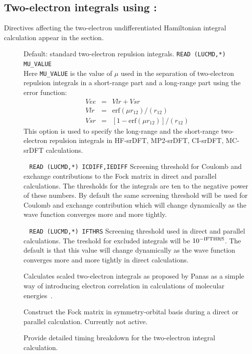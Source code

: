 
\subsection{Two-electron integrals using {\twoint}: }

Directives affecting the two-electron
undifferentiated Hamiltonian
integral calculation appear in the  section.

\begin{description}

\item[] Default: standard two-electron repulsion integrals.\newline
\verb|READ (LUCMD,*) MU_VALUE| \\
Here \verb|MU_VALUE| is the value of $\mu$ used in the separation of two-electron repulsion integrals in a short-range part and a long-range part using the error function:
\begin{eqnarray*}
Vee &=& Vlr+Vsr \\
Vlr &=& \mathrm{erf}(\mu r_{12})/(r_{12}) \\
Vsr &=& [1 -\mathrm{erf}(\mu r_{12})]/(r_{12}) 
\end{eqnarray*}
This option is used to specify the long-range and the short-range two-electron repulsion integrals
in HF-srDFT, MP2-srDFT, CI-srDFT, MC-srDFT calculations.

\item[]\verb| |\newline
\verb|READ (LUCMD,*) ICDIFF,IEDIFF|
Screening threshold for Coulomb and exchange
contributions to the Fock
matrix in direct and parallel calculations. The thresholds for the
integrals are ten to the negative power of these numbers. By default the same
screening threshold will be used for Coulomb and exchange
contribution which will change dynamically as the wave function
converges more and more tightly.

\item[]\verb| |\newline
\verb|READ (LUCMD,*) IFTHRS|
Screening threshold used in direct and
parallel calculations. The treshold for excluded integrals will be $10^{\rm -IFTHRS}$.
The default is that this value will change dynamically as the wave function converges more and more tightly
in direct calculations.

\item[] Calculates scaled two-electron integrals as
proposed by Panas as a simple way of introducing electron
correlation in calculations of molecular energies~\cite{ipcpl245}.

\item[] Construct the Fock matrix in symmetry-orbital
basis during a direct or parallel calculation. Currently not active.

\item[] Provide detailed timing breakdown for the
two-electron integral calculation.
\end{description}

